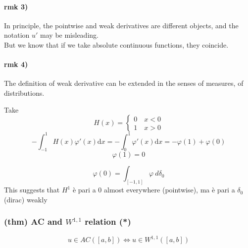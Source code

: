 \paragraph{rmk 3)}
In principle, the pointwise and weak derivatives are different objects, and the notation $u'$ may be misleading.\\
But we know that if we take absolute continuous functions, they coincide.
\paragraph{rmk 4)}
The definition of weak derivative can be extended in the senses of measures, of distributions.

Take $$H(x)=\begin{cases} 0\quad x<0\\ 1\quad x>0\end{cases}$$
$$-\int_{-1}^1 H(x)\varphi '(x)\mathrm d x = -\int_0^1 \varphi'(x)\mathrm d x = -\varphi(1)+\varphi(0)$$
$$\varphi(1)=0$$

$$\varphi(0)=\int_{[-1,1]} \varphi \mathrm\ d\delta_0$$
This suggests that $H^1$ è pari a 0 almost everywhere (pointwise), ma è pari a $\delta_0$ (dirac) weakly
\subsubsection{(thm) AC and $W^{1,1}$ relation (*)}
$$u\in  AC([a,b])\iff u \in W^{1,1}([a,b])$$
